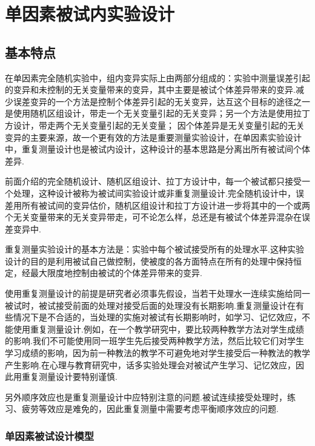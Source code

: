 \section{单因素被试内实验设计}

\subsection{基本特点}
在单因素完全随机实验中，组内变异实际上由两部分组成的：实验中测量误差引起的变异和未控制的无关变量带来的变异，其中主要是被试个体差异带来的变异.减少误差变异的一个方法是控制个体差异引起的无关变异，达互这个目标的途径之一是使用随机区组设计，带走一个无关变量引起的无关变异；另一个方法是使用拉丁方设计，带走两个无关变量引起的无关变量；
因个体差异是无关变量引起的无关变异的主要来源，故一个更有效的方法是重要测量实验设计，在单因素实验设计中，重复测量设计也是被试内设计，这种设计的基本思路是分离出所有被试间个体差异.

前面介绍的完全随机设计、随机区组设计、拉丁方设计中，每一个被试都只接受一个处理，这种设计被称为被试间实验设计或非重复测量设计.完全随机设计中，误差用所有被试间的变异估价，随机区组设计和拉丁方设计进一步将其中的一个或两个无关变量带来的无关变异带走，可不论怎么样，总还是有被试个体差异混杂在误差变异中.

重复测量实验设计的基本方法是：实验中每个被试接受所有的处理水平.这种实验设计的目的是利用被试自己做控制，使被度的各方面特点在所有的处理中保持恒定，经最大限度地控制由被试的个体差异带来的变异.

使用重复测量设计的前提是研究者必须事先假设，当若干处理水一连续实施给同一被试时，被试接受前面的处理对接受后面的处理没有长期影响.重复测量设计在有些情况下是不合适的，当处理的实施对被试有长期影响时，如学习、记忆效应，不能使用重复测量设计.例如，在一个教学研究中，要比较两种教学方法对学生成绩的影响.我们不可能使用同一班学生先后接受两种教学方法，然后比较它们对学生学习成绩的影响，因为前一种教法的教学不可避免地对学生接受后一种教法的教学产生影响.在心理与教育研究中，话多实验处理会对被试产生学习、记忆效应，因此用重复测量设计要特别谨慎.

另外顺序效应也是重复测量设计中应特别注意的问题.被试连续接受处理时，练习、疲劳等效应是难免的，因此重复测量中需要考虑平衡顺序效应的问题.

\subsubsection{单因素被试设计模型}

